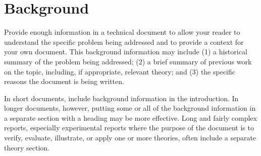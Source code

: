 \cleardoublepage
\chapter{Background}
\label{rel}

Provide enough information in a technical document to allow your
reader to understand the specific problem being addressed and to
provide a context for your own document. This background information
may include (1) a historical summary of the problem being addressed;
(2) a brief summary of previous work on the topic, including, if
appropriate, relevant theory; and (3) the specific reasons the
document is being written.

In short documents, include background information in the
introduction. In longer documents, however, putting some or all of
the background information in a separate section with a heading may
be more effective. Long and fairly complex reports, especially
experimental reports where the purpose of the document is to verify,
evaluate, illustrate, or apply one or more theories, often include a
separate theory section.

